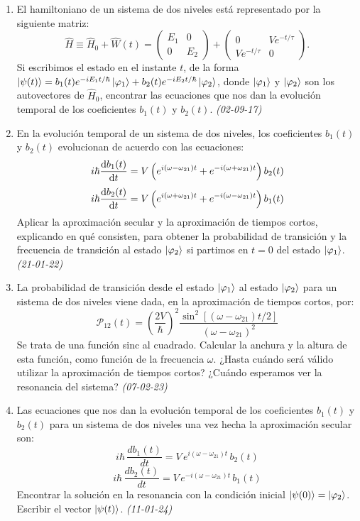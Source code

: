 \begin{enumerate}
    \item El hamiltoniano de un sistema de dos niveles está representado por la siguiente matriz:
    \[
    \hat{H} \equiv \hat{H}_0 + \hat{W}(t) = \begin{pmatrix} E_1 & 0 \\ 0 & E_2 \end{pmatrix} + \begin{pmatrix} 0 & V e^{-t/\tau} \\ V e^{-t/\tau} & 0 \end{pmatrix}.
    \]
    Si escribimos el estado en el instante $t$, de la forma $\ket{\psi(t)} = b_1(t) e^{-i E_1 t / \hbar} \ket{\varphi_1} + b_2(t) e^{-i E_2 t / \hbar} \ket{\varphi_2}$, donde $\ket{\varphi_1}$ y $\ket{\varphi_2}$ son los autovectores de $\hat{H}_0$, encontrar las ecuaciones que nos dan la evolución temporal de los coeficientes $b_1(t)$ y $b_2(t)$. \textit{(02-09-17)}

    \item En la evolución temporal de un sistema de dos niveles, los coeficientes $b_1(t)$ y $b_2(t)$ evolucionan de acuerdo con las ecuaciones:
    \[
    i \hbar \dv{b_1(t)}{t} = V \left( e^{i(\omega - \omega_{21})t} + e^{-i(\omega + \omega_{21})t} \right) b_2(t)
    \]
    \[
    i \hbar \dv{b_2(t)}{t} = V \left( e^{i(\omega + \omega_{21})t} + e^{-i(\omega - \omega_{21})t} \right) b_1(t)
    \]
    Aplicar la aproximación secular y la aproximación de tiempos cortos, explicando en qué consisten, para obtener la probabilidad de transición y la frecuencia de transición al estado $\ket{\varphi_2}$ si partimos en $t = 0$ del estado $\ket{\varphi_1}$. \textit{(21-01-22)}

    \item La probabilidad de transición desde el estado \(\ket{\varphi_1}\) al estado \(\ket{\varphi_2}\) para un sistema de dos niveles viene dada, en la aproximación de tiempos cortos, por:
    \[
    \mathcal{P}_{12} (t) = \left( \frac{2V}{\hbar} \right)^2 \frac{\sin^2 \left[ (\omega - \omega_{21}) t / 2 \right]}{(\omega - \omega_{21})^2}
    \]
    Se trata de una función sinc al cuadrado. Calcular la anchura y la altura de esta función, como función de la frecuencia \(\omega\). ¿Hasta cuándo será válido utilizar la aproximación de tiempos cortos? ¿Cuándo esperamos ver la resonancia del sistema? \textit{(07-02-23)}

    \item Las ecuaciones que nos dan la evolución temporal de los coeficientes \( b_1 (t) \) y \( b_2 (t) \) para un sistema de dos niveles una vez hecha la aproximación secular son:
    \[
    i \hbar \, \frac{d b_1 (t)}{d t} = V \, e^{i (\omega - \omega_{21}) t} \, b_2 (t)
    \]
    \[
    i \hbar \, \frac{d b_2 (t)}{d t} = V \, e^{-i (\omega - \omega_{21}) t} \, b_1 (t)
    \]
    Encontrar la solución en la resonancia con la condición inicial \(\ket{\psi (0)} = \ket{\varphi_2}\). Escribir el vector \(\ket{\psi (t)}\). \textit{(11-01-24)}

    

\end{enumerate}

